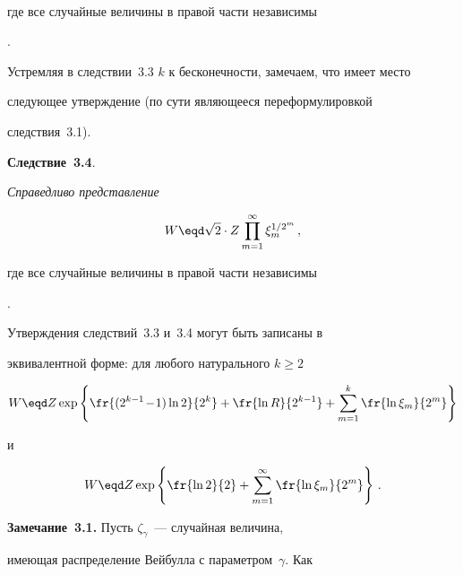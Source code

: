 \begin{multicols}{2}
{$$


где все случайные величины в правой части не\-за\-ви\-симы}.





\smallskip





Устремляя в следствии~3.3 $k$ к бесконечности, замечаем, что имеет место


следующее утверждение (по сути являющееся переформулировкой


следствия~3.1).





\medskip





\noindent


{\bf Следствие~3.4}. {\it Справедливо представление


$$


W\eqd \sqrt{2}\cdot Z \prod_{m=1}^{\infty}\xi_m^{1/2^m}\,,


$$


где все случайные величины в правой части не\-за\-ви\-симы}.





\smallskip





Утверждения следствий~3.3 и~3.4 могут быть записаны в


эквивалентной форме: для любого натурального $k\ge 2$


$$


W\eqd Z \exp\left\{\fr{(2^{k-1\!}-\!1)\ln 2}{2^k}+ \fr{\ln


R}{2^{k-1}}+\sum_{m=1}^{k}\fr{\ln\xi_m}{2^m}\right \}


$$


и


$$


W\eqd Z \exp\left\{\fr{\ln


2}{2}+\sum_{m=1}^{\infty}\fr{\ln\xi_m}{2^m}\right\}\,.


$$





\noindent


{\bf Замечание~3.1.} Пусть $\zeta_{\gamma}$~--- случайная величина,


имеющая распределение Вейбулла с параметром~$\gamma$. Как



\end{multicols}
